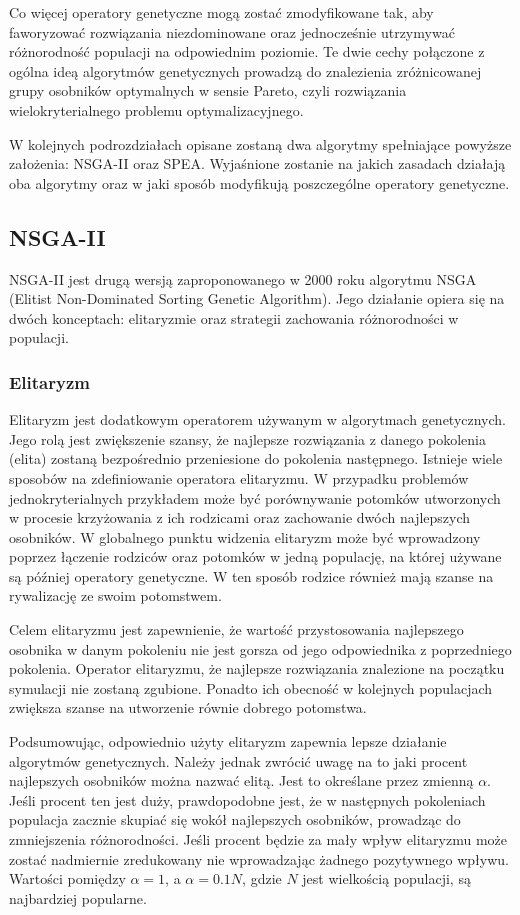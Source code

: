 \documentclass[twoside]{iisthesis}
\begin{document}
Co więcej operatory genetyczne mogą zostać zmodyfikowane tak, aby faworyzować rozwiązania niezdominowane oraz jednocześnie utrzymywać różnorodność populacji na odpowiednim poziomie. Te dwie cechy połączone z ogólna ideą algorytmów genetycznych prowadzą do znalezienia zróżnicowanej grupy osobników optymalnych w sensie Pareto, czyli rozwiązania wielokryterialnego problemu optymalizacyjnego.

W kolejnych podrozdziałach opisane zostaną dwa algorytmy spełniające powyższe założenia: NSGA-II oraz SPEA. Wyjaśnione zostanie na jakich zasadach działają oba algorytmy oraz w jaki sposób modyfikują poszczególne operatory genetyczne.
\subsection{NSGA-II}
NSGA-II jest drugą wersją zaproponowanego w 2000 roku algorytmu NSGA (Elitist Non-Dominated Sorting Genetic Algorithm). Jego działanie opiera się na dwóch konceptach: elitaryzmie oraz strategii zachowania różnorodności w populacji. 

\subsubsection{Elitaryzm}
Elitaryzm jest dodatkowym operatorem używanym w algorytmach genetycznych. Jego rolą jest zwiększenie szansy, że najlepsze rozwiązania z danego pokolenia (elita) zostaną bezpośrednio przeniesione do pokolenia następnego. Istnieje wiele sposobów na zdefiniowanie operatora elitaryzmu. W przypadku problemów jednokryterialnych przykładem może być porównywanie potomków utworzonych w procesie krzyżowania z ich rodzicami oraz zachowanie dwóch najlepszych osobników. W globalnego punktu widzenia elitaryzm może być wprowadzony poprzez łączenie rodziców oraz potomków w jedną populację, na której używane są później operatory genetyczne. W ten sposób rodzice również mają szanse na rywalizację ze swoim potomstwem.

Celem elitaryzmu jest zapewnienie, że wartość przystosowania najlepszego osobnika w danym pokoleniu nie jest gorsza od jego odpowiednika z poprzedniego pokolenia. Operator elitaryzmu, że najlepsze rozwiązania znalezione na początku symulacji nie zostaną zgubione. Ponadto ich obecność w kolejnych populacjach zwiększa szanse na utworzenie równie dobrego potomstwa. 

Podsumowując, odpowiednio użyty elitaryzm zapewnia lepsze działanie algorytmów genetycznych. Należy jednak zwrócić uwagę na to jaki procent najlepszych osobników można nazwać elitą. Jest to określane przez zmienną $\alpha$. Jeśli procent ten jest duży, prawdopodobne jest, że w następnych pokoleniach populacja zacznie skupiać się wokół najlepszych osobników, prowadząc do zmniejszenia różnorodności. Jeśli procent będzie za mały wpływ elitaryzmu może zostać nadmiernie zredukowany nie wprowadzając żadnego pozytywnego wpływu. Wartości pomiędzy $\alpha = 1$, a $\alpha = 0.1N$, gdzie $N$ jest wielkością populacji, są najbardziej popularne.\\
\end{document}
